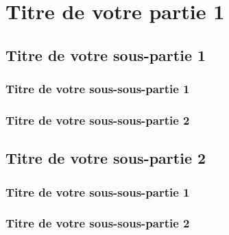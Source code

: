 \clearpage
\section{Titre de votre partie 1}

\subsection{Titre de votre sous-partie 1}

\subsubsection{Titre de votre sous-sous-partie 1}
\lipsum[1]

\subsubsection{Titre de votre sous-sous-partie 2}
\lipsum[2]

\subsection{Titre de votre sous-partie 2}

\subsubsection{Titre de votre sous-sous-partie 1}
\lipsum[3]

\subsubsection{Titre de votre sous-sous-partie 2}
\lipsum[4]
